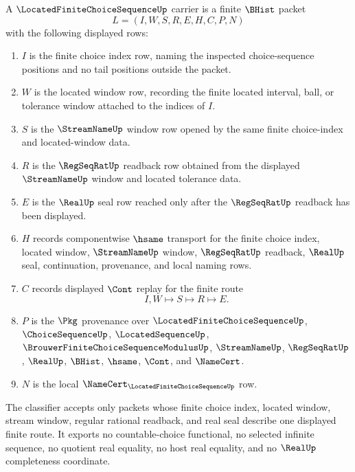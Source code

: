 \begin{definition}
\label{def:located-finite-choice-sequence-carrier}
A $\LocatedFiniteChoiceSequenceUp$ carrier is a finite $\BHist$ packet
$$
L=(I,W,S,R,E,H,C,P,N)
$$
with the following displayed rows:
\begin{enumerate}
\item $I$ is the finite choice index row, naming the inspected choice-sequence positions and no tail positions outside the packet.
\item $W$ is the located window row, recording the finite located interval, ball, or tolerance window attached to the indices of $I$.
\item $S$ is the $\StreamNameUp$ window row opened by the same finite choice-index and located-window data.
\item $R$ is the $\RegSeqRatUp$ readback row obtained from the displayed $\StreamNameUp$ window and located tolerance data.
\item $E$ is the $\RealUp$ seal row reached only after the $\RegSeqRatUp$ readback has been displayed.
\item $H$ records componentwise $\hsame$ transport for the finite choice index, located window, $\StreamNameUp$ window, $\RegSeqRatUp$ readback, $\RealUp$ seal, continuation, provenance, and local naming rows.
\item $C$ records displayed $\Cont$ replay for the finite route
$$
I,W \longmapsto S \longmapsto R \longmapsto E .
$$
\item $P$ is the $\Pkg$ provenance over $\LocatedFiniteChoiceSequenceUp$, $\ChoiceSequenceUp$, $\LocatedSequenceUp$, $\BrouwerFiniteChoiceSequenceModulusUp$, $\StreamNameUp$, $\RegSeqRatUp$, $\RealUp$, $\BHist$, $\hsame$, $\Cont$, and $\NameCert$.
\item $N$ is the local $\NameCert_{\LocatedFiniteChoiceSequenceUp}$ row.
\end{enumerate}
The classifier accepts only packets whose finite choice index, located window, stream window, regular rational readback, and real seal describe one displayed finite route. It exports no countable-choice functional, no selected infinite sequence, no quotient real equality, no host real equality, and no $\RealUp$ completeness coordinate.
\end{definition}

